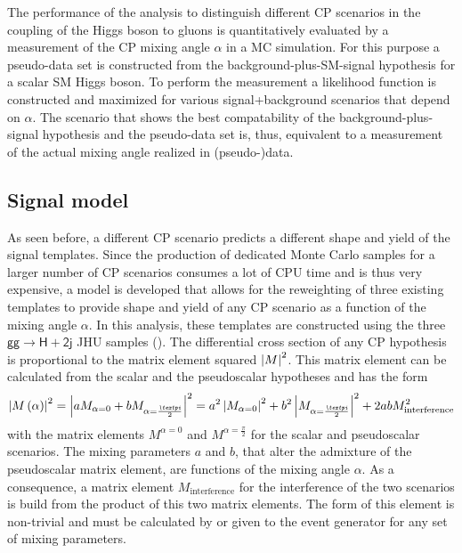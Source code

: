 %

The performance of the analysis to distinguish different CP scenarios in the coupling of the Higgs boson to gluons is 
quantitatively evaluated by a measurement of the CP mixing angle $\alpha$ in a MC simulation.
For this purpose a pseudo-data set is constructed from the background-plus-SM-signal hypothesis for a scalar SM Higgs boson. To perform the measurement a likelihood function is constructed and maximized
for various signal+background scenarios that depend on $\alpha$. The scenario that shows the best compatability of the background-plus-signal hypothesis
 and the pseudo-data set is, thus, equivalent to a measurement of the actual mixing angle realized in (pseudo-)data.


\subsection{Signal model}\label{SA:physicsmodel}
As seen before, a different CP scenario predicts a different shape and  yield of the signal templates. Since the production of dedicated Monte Carlo samples for a larger number of 
CP scenarios consumes a lot of CPU time and is thus very expensive, a model is developed that allows for 
the reweighting of three existing templates to provide shape and yield of any CP scenario as a function of the mixing angle $\alpha$.
In this analysis, these templates are constructed using  the three $\mathsf{gg\rightarrow H+2j}$ JHU samples ().\newline{}
The differential cross section of any CP hypothesis is proportional to the matrix element squared $\left| M \right|^2$. This matrix element can be calculated from the scalar and the pseudoscalar hypotheses 
and has the form
\begin{equation}
    \abs{M\li \alpha\re}^2 = \abs{aM_{\alpha=0}+bM_{\alpha=\frac{\pi}{2}}}^2 = a^2\abs{M_{\alpha=0}}^2 +  b^2\abs{M_{\alpha=\frac{\pi}{2}}}^2 + 2abM_{\text{interference}}^2
\end{equation}
with the matrix elements $M^{\alpha=0}$ and $M^{\alpha=\frac{\pi}{2}}$ for the scalar and pseudoscalar scenarios. The mixing parameters $a$ and $b$, that alter the admixture of the pseudoscalar matrix element, are functions of the mixing angle $\alpha$. As a consequence, a matrix element $M_{\text{interference}}$ for the interference of the two scenarios is build from the product of this two matrix elements. The form 
of this element is non-trivial and must be calculated by or given to the event generator for any set of mixing parameters.
